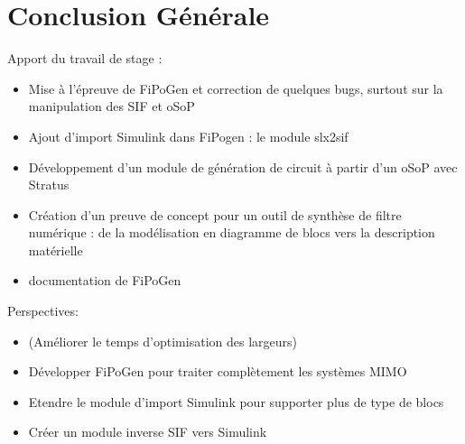 \chapter{Conclusion Générale}

Apport du travail de stage : \\
\begin{itemize}
\item Mise à l'épreuve de FiPoGen et correction de quelques bugs, surtout sur la manipulation des SIF et oSoP
\item Ajout d'import Simulink dans FiPogen : le module slx2sif
\item Développement d'un module de génération de circuit à partir d'un oSoP avec Stratus
\item Création d'un preuve de concept pour un outil de synthèse de filtre numérique : de la modélisation en diagramme de blocs vers la description matérielle
\item documentation de FiPoGen
\end{itemize}

\bigskip
Perspectives:\\
\begin{itemize}
\item (Améliorer le temps d'optimisation des largeurs)
\item Développer FiPoGen pour traiter complètement les systèmes MIMO
\item Etendre le module d'import Simulink pour supporter plus de type de blocs
\item Créer un module inverse SIF vers Simulink
\end{itemize}